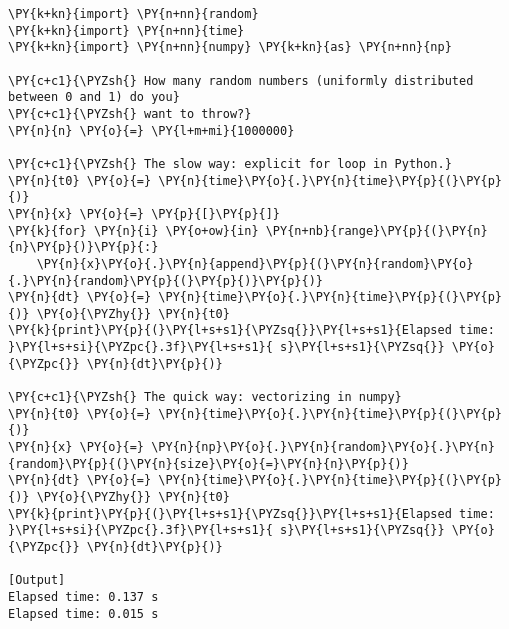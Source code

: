 \begin{Verbatim}[label=\makebox{\url{https://github.com/lucabaldini/cmepda/tree/master/slides/latex/snippets/vectorization.py}},commandchars=\\\{\}]
\PY{k+kn}{import} \PY{n+nn}{random}
\PY{k+kn}{import} \PY{n+nn}{time}
\PY{k+kn}{import} \PY{n+nn}{numpy} \PY{k+kn}{as} \PY{n+nn}{np}

\PY{c+c1}{\PYZsh{} How many random numbers (uniformly distributed between 0 and 1) do you}
\PY{c+c1}{\PYZsh{} want to throw?}
\PY{n}{n} \PY{o}{=} \PY{l+m+mi}{1000000}

\PY{c+c1}{\PYZsh{} The slow way: explicit for loop in Python.}
\PY{n}{t0} \PY{o}{=} \PY{n}{time}\PY{o}{.}\PY{n}{time}\PY{p}{(}\PY{p}{)}
\PY{n}{x} \PY{o}{=} \PY{p}{[}\PY{p}{]}
\PY{k}{for} \PY{n}{i} \PY{o+ow}{in} \PY{n+nb}{range}\PY{p}{(}\PY{n}{n}\PY{p}{)}\PY{p}{:}
    \PY{n}{x}\PY{o}{.}\PY{n}{append}\PY{p}{(}\PY{n}{random}\PY{o}{.}\PY{n}{random}\PY{p}{(}\PY{p}{)}\PY{p}{)}
\PY{n}{dt} \PY{o}{=} \PY{n}{time}\PY{o}{.}\PY{n}{time}\PY{p}{(}\PY{p}{)} \PY{o}{\PYZhy{}} \PY{n}{t0}
\PY{k}{print}\PY{p}{(}\PY{l+s+s1}{\PYZsq{}}\PY{l+s+s1}{Elapsed time: }\PY{l+s+si}{\PYZpc{}.3f}\PY{l+s+s1}{ s}\PY{l+s+s1}{\PYZsq{}} \PY{o}{\PYZpc{}} \PY{n}{dt}\PY{p}{)}

\PY{c+c1}{\PYZsh{} The quick way: vectorizing in numpy}
\PY{n}{t0} \PY{o}{=} \PY{n}{time}\PY{o}{.}\PY{n}{time}\PY{p}{(}\PY{p}{)}
\PY{n}{x} \PY{o}{=} \PY{n}{np}\PY{o}{.}\PY{n}{random}\PY{o}{.}\PY{n}{random}\PY{p}{(}\PY{n}{size}\PY{o}{=}\PY{n}{n}\PY{p}{)}
\PY{n}{dt} \PY{o}{=} \PY{n}{time}\PY{o}{.}\PY{n}{time}\PY{p}{(}\PY{p}{)} \PY{o}{\PYZhy{}} \PY{n}{t0}
\PY{k}{print}\PY{p}{(}\PY{l+s+s1}{\PYZsq{}}\PY{l+s+s1}{Elapsed time: }\PY{l+s+si}{\PYZpc{}.3f}\PY{l+s+s1}{ s}\PY{l+s+s1}{\PYZsq{}} \PY{o}{\PYZpc{}} \PY{n}{dt}\PY{p}{)}

[Output]
Elapsed time: 0.137 s
Elapsed time: 0.015 s
\end{Verbatim}